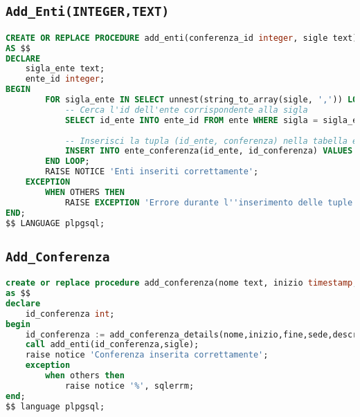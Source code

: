 \subsection{\texttt{Add\_Enti(INTEGER,TEXT)}}
\begin{lstlisting}[language=SQL,style=mystyle]
CREATE OR REPLACE PROCEDURE add_enti(conferenza_id integer, sigle text)
AS $$
DECLARE
    sigla_ente text;
    ente_id integer;
BEGIN
        FOR sigla_ente IN SELECT unnest(string_to_array(sigle, ',')) LOOP
            -- Cerca l'id dell'ente corrispondente alla sigla
            SELECT id_ente INTO ente_id FROM ente WHERE sigla = sigla_ente;
            
            -- Inserisci la tupla (id_ente, conferenza) nella tabella ente_conferenza
            INSERT INTO ente_conferenza(id_ente, id_conferenza) VALUES (ente_id, conferenza_id);
        END LOOP;
        RAISE NOTICE 'Enti inseriti correttamente';
    EXCEPTION
        WHEN OTHERS THEN
            RAISE EXCEPTION 'Errore durante l''inserimento delle tuple nella tabella ente_conferenza: %', SQLERRM;
END;
$$ LANGUAGE plpgsql;
\end{lstlisting}
\subsection{\texttt{Add\_Conferenza}}
\begin{lstlisting}[language=SQL,style=mystyle]
create or replace procedure add_conferenza(nome text, inizio timestamp, fine timestamp, sede integer, descrizione text, sigle text, utente integer)
as $$
declare
    id_conferenza int;
begin
    id_conferenza := add_conferenza_details(nome,inizio,fine,sede,descrizione,utente);
    call add_enti(id_conferenza,sigle);
    raise notice 'Conferenza inserita correttamente';
    exception
        when others then
            raise notice '%', sqlerrm;
end;
$$ language plpgsql;
\end{lstlisting}
